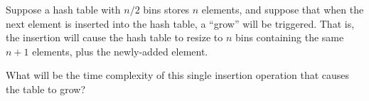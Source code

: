 \begin{prob}
    Suppose a hash table with $n/2$ bins stores $n$ elements, and suppose that when the
    next element is inserted into the hash table, a ``grow'' will be triggered. That is,
    the insertion will cause the hash table to resize to $n$ bins containing the same
    $n + 1$ elements, plus the newly-added element.

    What will be the time complexity of this single insertion operation that causes
    the table to grow?


\end{prob}
